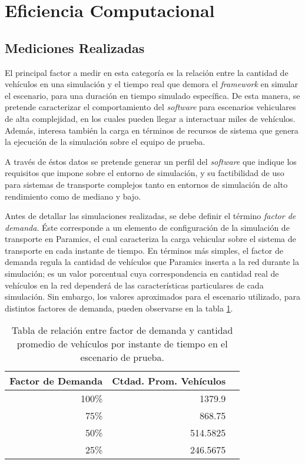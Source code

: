 \section{Eficiencia Computacional}\label{sec:results:performance}
\subsection{Mediciones Realizadas}

El principal factor a medir en esta categoría es la relación entre la cantidad de vehículos en una simulación y el tiempo real que demora el \emph{framework} en simular el escenario, para una duración en tiempo simulado específica. De esta manera, se pretende caracterizar el comportamiento del \emph{software} para escenarios vehiculares de alta complejidad, en los cuales pueden llegar a interactuar miles de vehículos. Además, interesa también la carga en términos de recursos de sistema que genera la ejecución de la simulación sobre el equipo de prueba. 

A través de éstos datos se pretende generar un perfil del \emph{software} que indique los requisitos que impone sobre el entorno de simulación, y su factibilidad de uso para sistemas de transporte complejos tanto en entornos de simulación de alto rendimiento como de mediano y bajo.

Antes de detallar las simulaciones realizadas, se debe definir el término \emph{factor de demanda}. Éste corresponde a un elemento de configuración de la simulación de transporte en Paramics, el cual caracteriza la carga vehicular sobre el sistema de transporte en cada instante de tiempo. En términos más simples, el factor de demanda regula la cantidad de vehículos que Paramics inserta a la red durante la simulación; es un valor porcentual cuya correspondencia en cantidad real de vehículos en la red dependerá de las características particulares de cada simulación. Sin embargo, los valores aproximados para el escenario utilizado, para distintos factores de demanda, pueden observarse en la tabla \ref{table:demandfactor}.

\begin{table}[tpb]
    \centering
    \begin{tabular}{@{}rrr@{}}
        \textbf{Factor de Demanda} & \textbf{Ctdad. Prom. Vehículos} \\ \midrule
        100\%           & 1379.9 \\ %
        75\%            & 868.75 \\ %
        50\%            & 514.5825 \\ %
        25\%            & 246.5675 \\ \bottomrule
    \end{tabular}
    \caption[Factor de demanda vs. cantidad promedio de vehículos]{Tabla de relación entre factor de demanda y cantidad promedio de vehículos por instante de tiempo en el escenario de prueba.}
    \label{table:demandfactor}
\end{table}

